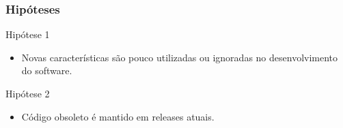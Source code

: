 \documentclass[]{beamer}
\begin{document}
	
	\begin{frame}[fragile]\frametitle{Hipóteses}
		
		\begin{block}{Hipótese 1}
			\begin{itemize}
				\item Novas características são pouco utilizadas ou ignoradas no desenvolvimento do software.
			\end{itemize}
		
		\end{block}
		
		\begin{block}{Hipótese 2}
			\begin{itemize}
				\item Código obsoleto é mantido em releases atuais.
			\end{itemize}
		\end{block}
		
		
	\end{frame}
	
\end{document}
